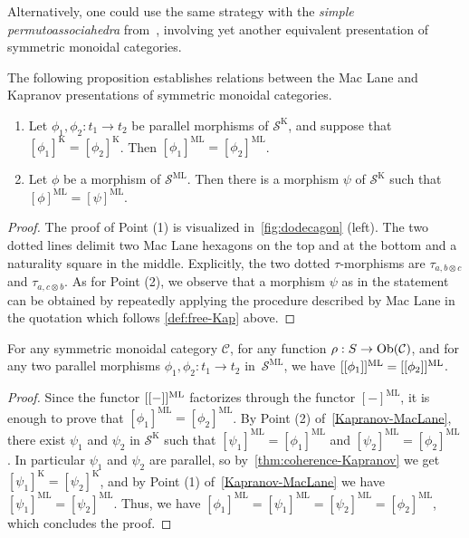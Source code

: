 \begin{rem}
\label{rem:simple-permutoassociahedron}
 Alternatively, one could use the same strategy with the \emph{simple permutoassociahedra} from~\cite{baralicSimplePermutoassociahedron2019}, involving yet another equivalent presentation of symmetric monoidal categories. 
\end{rem}
The following proposition establishes relations between the Mac Lane and Kapranov presentations of symmetric monoidal categories.
\begin{proposition}
\label{Kapranov-MacLane}
\leavevmode
\begin{enumerate}
\item Let $\phi_1,\phi_2: t_1 \to t_2$  be parallel morphisms of $\mathcal{S}^{\mathrm{K}}$, and suppose that $[\phi_1]^{\mathrm{K}}=[\phi_2]^{\mathrm{K}}$. Then $[\phi_1]^{\mathrm{ML}}=[\phi_2]^{\mathrm{ML}}$.
\item Let $\phi$ be a morphism of $\mathcal{S}^{\mathrm{ML}}$. Then there is a morphism $\psi$ of 
$\mathcal{S}^{\mathrm{K}}$ such that $[\phi]^{\mathrm{ML}}=[\psi]^{\mathrm{ML}}$.
\end{enumerate}
\end{proposition}
\begin{proof}
The proof of Point (1) is visualized in~\cref{fig:dodecagon} (left).  
The two dotted lines delimit two Mac Lane hexagons on the top and at the bottom and a naturality square in the middle.
Explicitly, the two dotted $\tau$-morphisms are $\tau_{a,b\otimes c}$ and $\tau_{a,c\otimes b}$.  
As for Point (2), we observe that a morphism $\psi$ as in the statement can be obtained by repeatedly applying the procedure described by Mac Lane in the quotation which follows \cref{def:free-Kap} above.
\end{proof}
\begin{thm}
\label{thm:coherence-MacLane}
    For any symmetric monoidal category $\mathcal{C}$, for any  function $\rho : S \to \mathrm{Ob}(\mathcal{C})$, and for any two parallel morphisms $\phi_1,\phi_2: t_1 \to t_2$ in~$\mathcal{S}^{\mathrm{ML}}$, we have $[[\phi_1]]^{\mathrm{ML}}=[[\phi_2]]^{\mathrm{ML}}$.
\end{thm}
\begin{proof} 
Since the functor $[[-]]^{\mathrm{ML}}$ factorizes through the functor $[-]^{\mathrm{ML}}$, it is enough to prove that $[\phi_1]^{\mathrm{ML}}=
[\phi_2]^{\mathrm{ML}}$. 
By Point (2) of~\cref{Kapranov-MacLane}, there exist $\psi_1$ and $\psi_2$ in $\mathcal{S}^{\mathrm{K}}$ such that $[\psi_1]^{\mathrm{ML}}=[\phi_1]^{\mathrm{ML}}$ and 
$[\psi_2]^{\mathrm{ML}}=[\phi_2]^{\mathrm{ML}}$.
In particular $\psi_1$ and $\psi_2$ are parallel, so by~\cref{thm:coherence-Kapranov} we get $[\psi_1]^{\mathrm{K}}=[\psi_2]^{\mathrm{K}}$, and by Point (1) of~\cref{Kapranov-MacLane} we have $[\psi_1]^{\mathrm{ML}}=[\psi_2]^{\mathrm{ML}}$.
Thus, we have $[\phi_1]^{\mathrm{ML}} = [\psi_1]^{\mathrm{ML}} =  [\psi_2]^{\mathrm{ML}} =  [\phi_2]^{\mathrm{ML}}$, which concludes the proof.
\end{proof}
